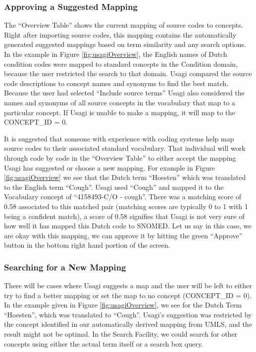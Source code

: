 \documentclass[11pt]{book}
\theoremstyle{definition}
\theoremstyle{definition}
\theoremstyle{definition}
\theoremstyle{remark}
\begin{document}
\hypertarget{approving-a-suggested-mapping}{%
\subsubsection*{Approving a Suggested Mapping}\label{approving-a-suggested-mapping}}

The ``Overview Table'' shows the current mapping of source codes to concepts. Right after importing source codes, this mapping contains the automatically generated suggested mappings based on term similarity and any search options. In the example in Figure \ref{fig:usagiOverview}, the English names of Dutch condition codes were mapped to standard concepts in the Condition domain, because the user restricted the search to that domain. Usagi compared the source code descriptions to concept names and synonyms to find the best match. Because the user had selected ``Include source terms'' Usagi also considered the names and synonyms of all source concepts in the vocabulary that map to a particular concept. If Usagi is unable to make a mapping, it will map to the CONCEPT\_ID = 0.

It is suggested that someone with experience with coding systems help map source codes to their associated standard vocabulary. That individual will work through code by code in the ``Overview Table'' to either accept the mapping Usagi has suggested or choose a new mapping. For example in Figure \ref{fig:usagiOverview} we see that the Dutch term ``Hoesten'' which was translated to the English term ``Cough''. Usagi used ``Cough'' and mapped it to the Vocabulary concept of ``4158493-C/O - cough''. There was a matching score of 0.58 associated to this matched pair (matching scores are typically 0 to 1 with 1 being a confident match), a score of 0.58 signifies that Usagi is not very sure of how well it has mapped this Dutch code to SNOMED. Let us say in this case, we are okay with this mapping, we can approve it by hitting the green ``Approve'' button in the bottom right hand portion of the screen.

\hypertarget{searching-for-a-new-mapping}{%
\subsubsection*{Searching for a New Mapping}\label{searching-for-a-new-mapping}}

There will be cases where Usagi suggests a map and the user will be left to either try to find a better mapping or set the map to no concept (CONCEPT\_ID = 0). In the example given in Figure \ref{fig:usagiOverview}, we see for the Dutch Term ``Hoesten'', which was translated to ``Cough''. Usagi's suggestion was restricted by the concept identified in our automatically derived mapping from UMLS, and the result might not be optimal. In the Search Facility, we could search for other concepts using either the actual term itself or a search box query.
\end{document}
